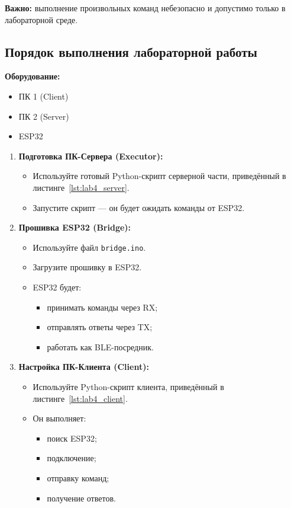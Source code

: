 \textbf{Важно:} выполнение произвольных команд небезопасно и допустимо только в лабораторной среде.

\subsection{Порядок выполнения лабораторной работы}

\textbf{Оборудование:}
\begin{itemize}
    \item ПК 1 (Client)
    \item ПК 2 (Server)
    \item ESP32
\end{itemize}

\begin{enumerate}

\item \textbf{Подготовка ПК-Сервера (Executor):}
\begin{itemize}
  \item Используйте готовый Python-скрипт серверной части, приведённый в листинге~\ref{lst:lab4_server}.
    

    \item Запустите скрипт — он будет ожидать команды от ESP32.
\end{itemize}

\item \textbf{Прошивка ESP32 (Bridge):}
\begin{itemize}
    \item Используйте файл \texttt{bridge.ino}.
    \item Загрузите прошивку в ESP32.
    \item ESP32 будет:
    \begin{itemize}
        \item принимать команды через RX;
        \item отправлять ответы через TX;
        \item работать как BLE-посредник.
    \end{itemize}
\end{itemize}

\item \textbf{Настройка ПК-Клиента (Client):}
\begin{itemize}
  \item Используйте Python-скрипт клиента, приведённый в листинге~\ref{lst:lab4_client}.
    \item Он выполняет:
    \begin{itemize}
        \item поиск ESP32;
        \item подключение;
        \item отправку команд;
        \item получение ответов.
    \end{itemize}
\end{itemize}


\end{enumerate}
